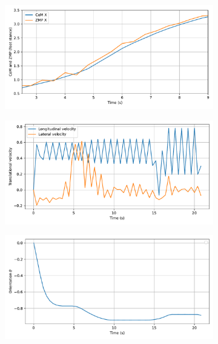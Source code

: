 \begin{figure}[H]
    \centering
    \begin{subfigure}{0.45\linewidth}
        \centering
        \includegraphics[width=\linewidth]{figures/Simulations/sim1circles_delta/evolution_4.pdf}
    \end{subfigure}
    \begin{subfigure}{0.45\linewidth}
        \centering
        \includegraphics[width=\linewidth]{figures/Simulations/sim1circles_delta/evolution_1.pdf}
    \end{subfigure}
    \hfill
    \begin{subfigure}{0.45\linewidth}
        \centering
        \includegraphics[width=\linewidth]{figures/Simulations/sim1circles_delta/evolution_2.pdf}

\end{subfigure}
\end{figure}
